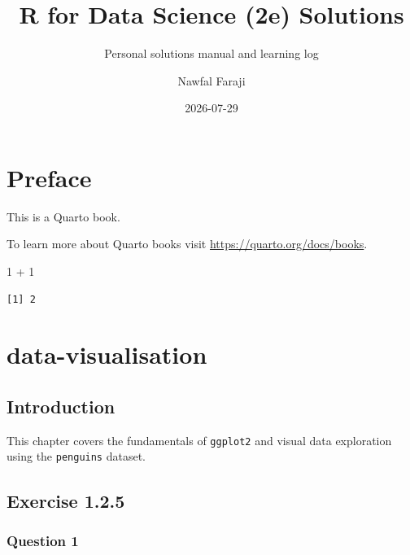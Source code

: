 \documentclass[
  letterpaper,
  DIV=11,
  numbers=noendperiod]{scrreprt}
\title{R for Data Science (2e) Solutions}
\subtitle{Personal solutions manual and learning log}
\author{Nawfal Faraji}
\date{2026-07-29}
\newenvironment{Shaded}{\begin{snugshade}}{\end{snugshade}}
\newcommand{\DecValTok}[1]{\textcolor[rgb]{0.68,0.00,0.00}{#1}}
\newcommand{\SpecialCharTok}[1]{\textcolor[rgb]{0.37,0.37,0.37}{#1}}
\renewcommand*\contentsname{Table of contents}
\newcommand\contentsname{Table of contents}
\begin{document}
\maketitle

\renewcommand*\contentsname{Table of contents}
{
\setcounter{tocdepth}{2}
\tableofcontents
}


\chapter*{Preface}\label{preface}


This is a Quarto book.

To learn more about Quarto books visit
\url{https://quarto.org/docs/books}.

\begin{Shaded}
\begin{Highlighting}[]
\DecValTok{1} \SpecialCharTok{+} \DecValTok{1}
\end{Highlighting}
\end{Shaded}

\begin{verbatim}
[1] 2
\end{verbatim}


\chapter{data-visualisation}\label{data-visualisation}

\section{Introduction}\label{introduction}

This chapter covers the fundamentals of \texttt{ggplot2} and visual data
exploration using the \texttt{penguins} dataset.

\section{Exercise 1.2.5}\label{exercise-1.2.5}

\subsection{Question 1}\label{question-1}
\end{document}
